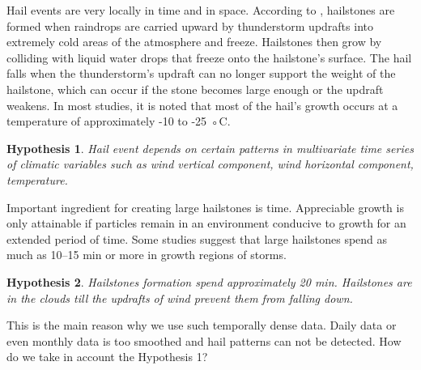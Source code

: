 \documentclass{article}
\begin{document}
Hail events are very locally in time and in space. According to \cite{hailform}, hailstones are formed when raindrops are carried upward by thunderstorm updrafts into extremely cold areas of the atmosphere and freeze. Hailstones then grow by colliding with liquid water drops that freeze onto the hailstone’s surface. The hail falls when the thunderstorm's updraft can no longer support the weight of the hailstone, which can occur if the stone becomes large enough or the updraft weakens. In most studies, it is noted that most of the hail's growth occurs at a temperature of approximately -10 to -25 ◦C.

\newtheorem{Hypothesis}{Hypothesis}
\begin{Hypothesis}
Hail event depends on certain patterns in multivariate time series of climatic variables  such as wind vertical component, wind horizontal component, temperature.
\end{Hypothesis}
Important ingredient for creating large hailstones is time. Appreciable growth is only attainable if particles remain in an environment conducive to growth for an extended period of time. Some studies suggest that large hailstones spend as much as 10–15 min or more in growth regions of storms.
\begin{Hypothesis}
Hailstones formation spend approximately 20 min. Hailstones are in the clouds till the updrafts of wind prevent them from falling down.
\end{Hypothesis}

This is the main reason why we use such temporally dense data. Daily data or even monthly data is too smoothed and hail patterns can not be detected.
How do we take in account the Hypothesis 1?

\end{document}

